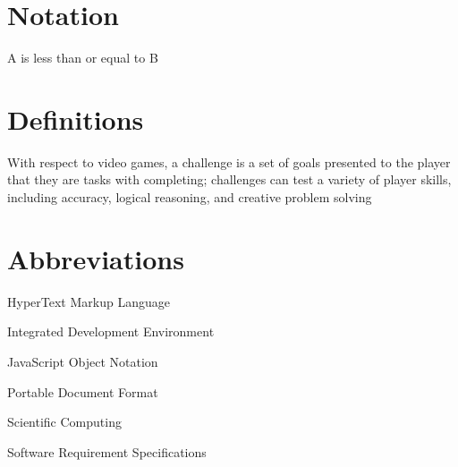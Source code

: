 
\section*{Notation}
\begin{description}[font=\rmfamily\bfseries, leftmargin=3cm, style=nextline]
	\item[$A \leq B$] A is less than or equal to B
\end{description}

\section*{Definitions}
\begin{description}[font=\rmfamily\bfseries, leftmargin=3cm, style=nextline]
	\item[Challenge] With respect to video games, a challenge is a set of goals presented to the player that they are tasks with completing; challenges can test a variety of player skills, including accuracy, logical reasoning, and creative problem solving
\end{description}

\section*{Abbreviations}
\begin{description}[font=\rmfamily\bfseries, leftmargin=3cm, style=nextline]
	\item[CSS]
	\item[HTML] HyperText Markup Language
	\item[IDE] Integrated Development Environment 
	\item[JSON] JavaScript Object Notation
	\item[PDF] Portable Document Format
	\item[SC] Scientific Computing
	\item[SRS] Software Requirement Specifications
\end{description}